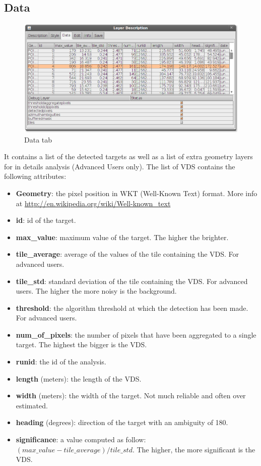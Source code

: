 \documentclass[12pt,a4paper,final]{report}
\begin{document}
\subsection{Data}
\begin{figure}[H]
 \centering
 \includegraphics[scale=0.45,keepaspectratio=true]{./images/VDS8.png}
 \caption{Data tab}
\end{figure}
It contains a list of the detected targets as well as a list of extra geometry layers for in details analysis (Advanced Users only).
The list of VDS contains the following attributes:
\begin{itemize}
 \item \textbf{Geometry}: the pixel position in WKT (Well-Known Text) format. More info at \url{http://en.wikipedia.org/wiki/Well-known_text}
 \item \textbf{id}: id of the target.
 \item \textbf{max\_value}: maximum value of the target. The higher the brighter.
 \item \textbf{tile\_average}: average of the values of the tile containing the VDS.
For advanced users.
 \item \textbf{tile\_std}: standard deviation of the tile containing the VDS. For advanced users.
The higher the more noisy is the background.
 \item \textbf{threshold}: the algorithm threshold at which the detection has been made.
For advanced users.
 \item \textbf{num\_of\_pixels}: the number of pixels that have been aggregated to a single target.
The highest the bigger is the VDS.
 \item \textbf{runid}: the id of the analysis.
 \item \textbf{length} (meters): the length of the VDS.
 \item \textbf{width} (meters): the width of the target. Not much reliable and often over estimated.
 \item \textbf{heading} (degrees): direction of the target with an ambiguity of 180\textdegree.
 \item \textbf{significance}: a value computed as follow: $(max\_value-tile\_average)/tile\_std$.
The higher, the more significant is the VDS.
\end{itemize}
\end{document}
